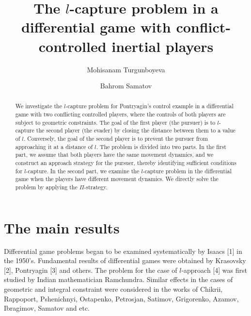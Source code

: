 \documentclass[12pt]{llncs}
\begin{document}
\fi

\title{The $l$-capture problem in a differential game with conflict-controlled inertial players}

\author{Mohisanam Turgunboyeva  \and  Bahrom Samatov
  }

\maketitle

\begin{abstract}
We investigate the $l$-capture problem for Pontryagin's control example in a differential game with two conflicting controlled players, where the controls of both players are subject to geometric constraints. The goal of the first player (the pursuer) is to $l$-capture the second player (the evader) by closing the distance between them to a value of $l$. Conversely, the goal of the second player is to prevent the pursuer from approaching it at a distance of $l$. The problem is divided into two parts. In the first part, we assume that both players have the same movement dynamics, and we construct an approach strategy for the pursuer, thereby identifying sufficient conditions for $l$-capture. In the second part, we examine the $l$-capture problem in the differential game when the players have different movement dynamics. We directly solve the problem by applying the $\Pi$-strategy.


\end{abstract}


\section{The main results} %

Differential game problems began to be examined systematically by Isaacs [1] in the 1950's. Fundamental results of differential games were
obtained by Krasovsky [2], Pontryagin [3] and others. The problem for the case of $l$-approach [4] was first studied by Indian mathematician Ramchundra. Similar effects in the cases of geometric and integral constraint were considered in the works of Chikrii,
Rappoport, Pshenichnyi, Ostapenko, Petrosjan, Satimov, Grigorenko, Azamov, Ibragimov, Samatov and etc.
\end{document}
